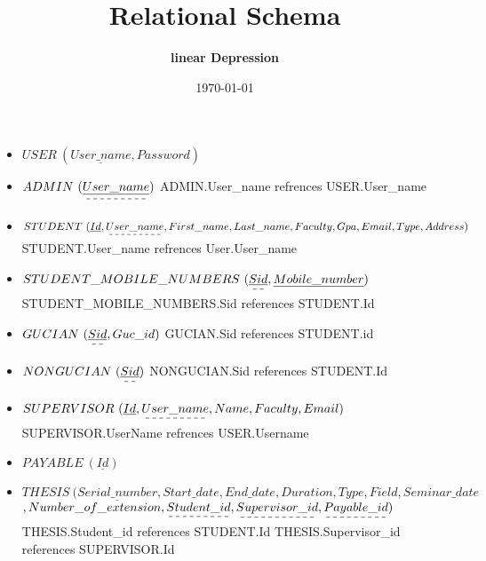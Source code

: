 \documentclass[a4paper]{article}
\begin{document}
\author{\textbf{linear Depression}}
\title{\textbf{Relational Schema}}
\date {\today}
\maketitle

\noindent
\begin{itemize}
\item $USER\ (\underline{User\_name},Password) $
 \newline
 \item $ADMIN\ (\dashuline{\underline{User\_name}}) $ 
 \newline ADMIN.User\_name refrences USER.User\_name
 \newline  
 \item$STUDENT \  (\underline{Id},\dashuline{User\_name} ,First\_name, Last\_name , Faculty, Gpa, Email,Type,Address )$
 \newline STUDENT.User\_name refrences User.User\_name
 \newline
 \item$STUDENT\_MOBILE\_NUMBERS\  (\dashuline{\underline{Sid}}, \underline{Mobile\_number})$
    \newline STUDENT\_MOBILE\_NUMBERS.Sid references STUDENT.Id
 \newline
 \item$ GUCIAN \ (\dashuline{\underline{Sid}}, Guc\_id)$
    \newline GUCIAN.Sid references STUDENT.id   
\newline
\item$ NONGUCIAN \ (\dashuline{\underline{Sid}})$
    \newline NONGUCIAN.Sid references STUDENT.Id
\newline
\item$SUPERVISOR \ (\underline{Id},\dashuline{User\_name}, Name , Faculty, Email)$
\newline SUPERVISOR.UserName refrences USER.User\-name
\item$PAYABLE\ (\underline{Id})$
\newline
\item$ THESIS \ (\underline{Serial\_number}, Start\_date, End\_date, Duration , Type,Field, Seminar\_date$\newline$ , Number\_of\_extension,\dashuline{Student\_id} ,\dashuline{Supervisor\_id} , \dashuline{Payable\_id})$
    \newline THESIS.Student\_id references STUDENT.Id
    \newline THESIS.Supervisor\_id references SUPERVISOR.Id

\end{itemize}
\end{document}
